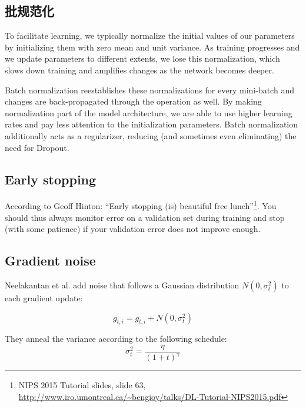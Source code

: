 \documentclass{article}
\begin{document}
\subsection{批规范化}

To facilitate learning, we typically normalize the initial values of our parameters by initializing them with zero mean and unit variance. As training progresses and we update parameters to different extents, we lose this normalization, which slows down training and amplifies changes as the network becomes deeper.

Batch normalization \cite{Ioffe2015a} reestablishes these normalizations for every mini-batch and changes are back-propagated through the operation as well. By making normalization part of the model architecture, we are able to use higher learning rates and pay less attention to the initialization parameters. Batch normalization additionally acts as a regularizer, reducing (and sometimes even eliminating) the need for Dropout.

\subsection{Early stopping}

According to Geoff Hinton: ``Early stopping (is) beautiful free lunch''\footnote{NIPS 2015 Tutorial slides, slide 63,  \url{http://www.iro.umontreal.ca/~bengioy/talks/DL-Tutorial-NIPS2015.pdf}}. You should thus always monitor error on a validation set during training and stop (with some patience) if your validation error does not improve enough.

\subsection{Gradient noise}

Neelakantan et al. \cite{Neelakantan2015} add noise that follows a Gaussian distribution $N(0, \sigma^2_t)$ to each gradient update:

\begin{equation}
g_{t, i} = g_{t, i} + N(0, \sigma^2_t)
\end{equation}

They anneal the variance according to the following schedule:
\begin{equation}
\sigma^2_t = \frac{\eta}{(1 + t)^\gamma}
\end{equation}
\end{document}
